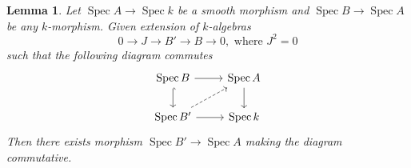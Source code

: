 \documentclass{ctexart}
\newtheorem{lemma}{Lemma}[section]
\newcommand{\spec}{\operatorname{Spec}}
\begin{document}
\begin{lemma}
    Let $\spec A \rightarrow \spec k$ be a smooth morphism and $\spec B \rightarrow \spec A$ be any $k$-morphism.
    Given extension of $k$-algebras
    \begin{equation}
        0 \longrightarrow J \longrightarrow B' \longrightarrow B \longrightarrow 0, \text{ where } J^{2} = 0
    \end{equation}
    such that the following diagram commutes
    \begin{equation}
        \begin{tikzcd}
            \spec B \arrow[r] \arrow[d, hookrightarrow] &
            \spec A \arrow[d] \\
            \spec B' \arrow[ur, dashrightarrow] \arrow[r] &
            \spec k
        \end{tikzcd}
    \end{equation}
    Then there exists morphism $\spec B' \rightarrow \spec A$ making the diagram commutative.
    \label{Lemma 1.1}
\end{lemma}
\end{document}
